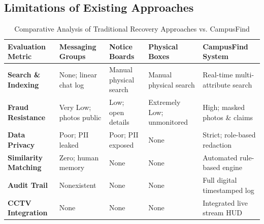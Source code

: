 \documentclass[11pt,a4paper]{article}
\begin{document}
\subsection{Limitations of Existing Approaches}

\begin{table}[H]
\centering
\small
\caption{Comparative Analysis of Traditional Recovery Approaches vs. CampusFind}
\begin{tabularx}{\textwidth}{lXXXX}
\toprule
\textbf{Evaluation Metric} & \textbf{Messaging Groups} & \textbf{Notice Boards} & \textbf{Physical Boxes} & \textbf{CampusFind System} \\
\midrule
\textbf{Search \& Indexing} & None; linear chat log & Manual physical search & Manual physical search & Real-time multi-attribute search \\
\textbf{Fraud Resistance} & Very Low; photos public & Low; open details & Extremely Low; unmonitored & High; masked photos \& claims \\
\textbf{Data Privacy} & Poor; PII leaked & Poor; PII exposed & None & Strict; role-based redaction \\
\textbf{Similarity Matching} & Zero; human memory & None & None & Automated rule-based engine \\
\textbf{Audit Trail} & Nonexistent & None & None & Full digital timestamped log \\
\textbf{CCTV Integration} & None & None & None & Integrated live stream HUD \\
\bottomrule
\end{tabularx}
\end{table}
\end{document}
